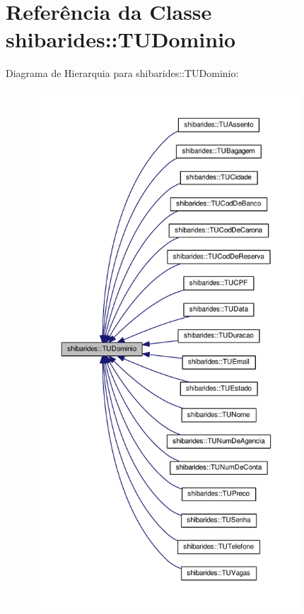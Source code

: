 \hypertarget{classshibarides_1_1TUDominio}{}\section{Referência da Classe shibarides\+:\+:T\+U\+Dominio}
\label{classshibarides_1_1TUDominio}


Diagrama de Hierarquia para shibarides\+:\+:T\+U\+Dominio\+:\nopagebreak
\begin{figure}[H]
\begin{center}
\leavevmode
\includegraphics[height=550pt]{classshibarides_1_1TUDominio__inherit__graph}
\end{center}
\end{figure}


